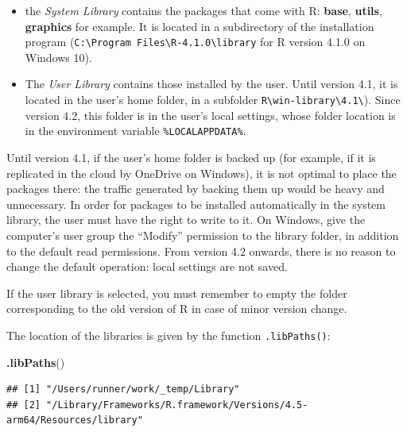 \documentclass[
  12pt,
  american,
  a4paper,
  extrafontsizes,onecolumn,openright
  ]{memoir}
\newenvironment{Shaded}{\begin{snugshade}}{\end{snugshade}}
\newcommand{\FunctionTok}[1]{\textcolor[rgb]{0.13,0.29,0.53}{\textbf{#1}}}
\newcommand{\NormalTok}[1]{#1}
\providecommand{\tightlist}{%
  \setlength{\itemsep}{0pt}\setlength{\parskip}{0pt}}
\begin{document}
\begin{itemize}
\tightlist
\item
  the \emph{System Library} contains the packages that come with R: \textbf{base}, \textbf{utils}, \textbf{graphics} for example.
  It is located in a subdirectory of the installation program (\texttt{C:\textbackslash{}Program\ Files\textbackslash{}R-4.1.0\textbackslash{}library} for R version 4.1.0 on Windows 10).
\item
  The \emph{User Library} contains those installed by the user.
  Until version 4.1, it is located in the user's home folder, in a subfolder \texttt{R\textbackslash{}win-library\textbackslash{}4.1\textbackslash{}}).
  Since version 4.2, this folder is in the user's local settings, whose folder location is in the environment variable \texttt{\%LOCALAPPDATA\%}.
\end{itemize}

Until version 4.1, if the user's home folder is backed up (for example, if it is replicated in the cloud by OneDrive on Windows), it is not optimal to place the packages there: the traffic generated by backing them up would be heavy and unnecessary.
In order for packages to be installed automatically in the system library, the user must have the right to write to it.
On Windows, give the computer's user group the \enquote{Modify} permission to the library folder, in addition to the default read permissions.
From version 4.2 onwards, there is no reason to change the default operation: local settings are not saved.

If the user library is selected, you must remember to empty the folder corresponding to the old version of R in case of minor version change.

The location of the libraries is given by the function \texttt{.libPaths()}:

\scriptsize

\begin{Shaded}
\begin{Highlighting}[]
\FunctionTok{.libPaths}\NormalTok{()}
\end{Highlighting}
\end{Shaded}

\begin{verbatim}
## [1] "/Users/runner/work/_temp/Library"                                    
## [2] "/Library/Frameworks/R.framework/Versions/4.5-arm64/Resources/library"
\end{verbatim}

\normalsize
\end{document}
